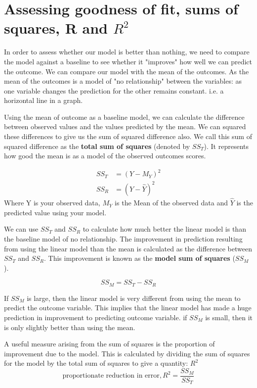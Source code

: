\section{Assessing goodness of fit, sums of squares, R and $R^2$}
In order to assess whether our model is better than nothing, we need to compare the model against a baseline to see whether it "improves" how well we can predict the outcome. We can compare our model with the mean of the outcomes. As the mean of the outcomes is a model of "no relationship" between the variables: as one variable changes the prediction for the other remains constant. i.e. a horizontal line in a graph. 

Using the mean of outcome as a baseline model, we can calculate the difference between observed values and the values predicted by the mean. We can squared these differences to give us the sum of squared difference also. We call this sum of squared difference as the \textbf{total sum of squares} (denoted by $SS_T$). It represents how good the mean is as a model of the observed outcomes scores.

\begin{equation}
\begin{split}
SS_T & = (Y-M_Y)^2 \\
SS_R & = (Y-\hat{Y})^2
\end{split}
\end{equation}
Where Y is your observed data, $M_Y$ is the Mean of the observed data and $\hat{Y}$ is the predicted value using your model.

We can use $SS_T$ and $SS_R$ to calculate how much better the linear model is than the baseline model of no relationship. The improvement in prediction resulting from using the linear model than the mean is calculated as the difference between $SS_T$ and $SS_R$. This improvement is known as the \textbf{model sum of squares} ($SS_M$). 

\begin{equation}
SS_M = SS_T - SS_R
\end{equation}

If $SS_M$ is large, then the linear model is very different from using the mean to predict the outcome variable. This implies that the linear model has made a huge prediction in improvement to predicting outcome variable. if $SS_M$ is small, then it is only slightly better than using the mean. 

A useful measure arising from the sum of squares is the proportion of improvement due to the model. This is calculated by dividing the sum of squares for the model by the total sum of squares to give a quantity: $R^2$
\begin{equation}
\text{proportionate reduction in error}, R^2 = \frac{SS_M}{SS_T}
\end{equation}

